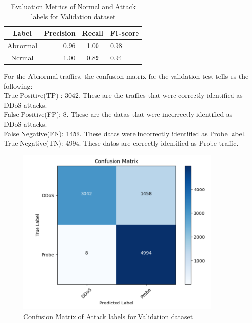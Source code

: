 \begin{table}[tbh]
	\centering
	\begin{tabular}{|c|r|c|l|} %
		\hline %
		Label  &Precision &Recall &F1-score \\
		\hline %
		Abnormal &0.96 &1.00 &0.98 \\
		\hline %
		Normal &1.00 &0.89 &0.94\\
		\hline
	\end{tabular}
	\caption{Evaluation Metrics of Normal and Attack labels for Validation dataset}
	\label{Evaluation Metrics of Normal and Attack labels for validation dataset}
\end{table}
For the Abnormal traffics, the confusion matrix for the validation test tells us the following:\\ 
True Positive(TP) : 3042. These are the traffics that were correctly identified as DDoS attacks.\\
False Positive(FP): 8. These are the datas that were incorrectly identified as DDoS attacks.\\
False Negative(FN): 1458. These datas were incorrectly identified as Probe label.\\
True Negative(TN): 4994. These datas are correctly identified as Probe traffic.\par 
\begin{figure}[tbh] %
	\begin{center}
		\includegraphics[width=4in]{images/valattacksmat.png} 
		\caption{Confusion Matrix of Attack labels for Validation dataset} %
		\label{Confusion Matrix of Attack labels for Validation dataset} 
	\end{center}
\end{figure}
